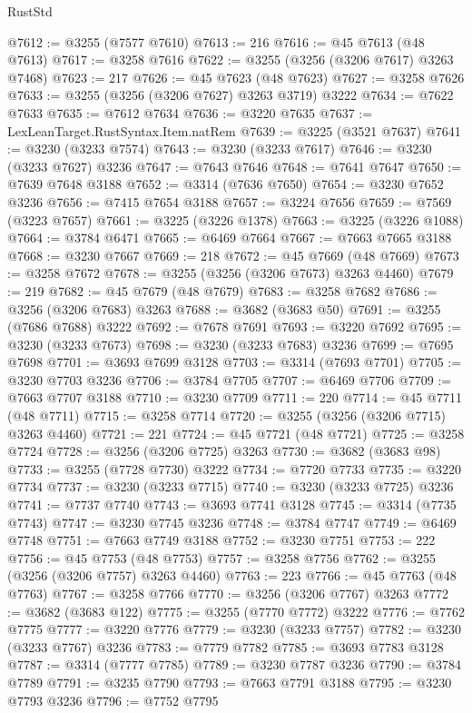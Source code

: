 \begin{lexlean}{RustStd}
\begin{coremodule}
{\begin{coremodule}
{{{{{{{{{{{{{{{{{{{{{{{{{{{{{{{{{{{{{@7612 := @3255 (@7577 @7610)
@7613 := 216
@7616 := @45 @7613 (@48 @7613)
@7617 := @3258 @7616
@7622 := @3255 (@3256 (@3206 @7617) @3263 @7468)
@7623 := 217
@7626 := @45 @7623 (@48 @7623)
@7627 := @3258 @7626
@7633 := @3255 (@3256 (@3206 @7627) @3263 @3719) @3222
@7634 := @7622 @7633
@7635 := @7612 @7634
@7636 := @3220 @7635
@7637 := LexLeanTarget.RustSyntax.Item.natRem
@7639 := @3225 (@3521 @7637)
@7641 := @3230 (@3233 @7574)
@7643 := @3230 (@3233 @7617)
@7646 := @3230 (@3233 @7627) @3236
@7647 := @7643 @7646
@7648 := @7641 @7647
@7650 := @7639 @7648 @3188
@7652 := @3314 (@7636 @7650)
@7654 := @3230 @7652 @3236
@7656 := @7415 @7654 @3188
@7657 := @3224 @7656
@7659 := @7569 (@3223 @7657)
@7661 := @3225 (@3226 @1378)
@7663 := @3225 (@3226 @1088)
@7664 := @3784 @6471
@7665 := @6469 @7664
@7667 := @7663 @7665 @3188
@7668 := @3230 @7667
@7669 := 218
@7672 := @45 @7669 (@48 @7669)
@7673 := @3258 @7672
@7678 := @3255 (@3256 (@3206 @7673) @3263 @4460)
@7679 := 219
@7682 := @45 @7679 (@48 @7679)
@7683 := @3258 @7682
@7686 := @3256 (@3206 @7683) @3263
@7688 := @3682 (@3683 @50)
@7691 := @3255 (@7686 @7688) @3222
@7692 := @7678 @7691
@7693 := @3220 @7692
@7695 := @3230 (@3233 @7673)
@7698 := @3230 (@3233 @7683) @3236
@7699 := @7695 @7698
@7701 := @3693 @7699 @3128
@7703 := @3314 (@7693 @7701)
@7705 := @3230 @7703 @3236
@7706 := @3784 @7705
@7707 := @6469 @7706
@7709 := @7663 @7707 @3188
@7710 := @3230 @7709
@7711 := 220
@7714 := @45 @7711 (@48 @7711)
@7715 := @3258 @7714
@7720 := @3255 (@3256 (@3206 @7715) @3263 @4460)
@7721 := 221
@7724 := @45 @7721 (@48 @7721)
@7725 := @3258 @7724
@7728 := @3256 (@3206 @7725) @3263
@7730 := @3682 (@3683 @98)
@7733 := @3255 (@7728 @7730) @3222
@7734 := @7720 @7733
@7735 := @3220 @7734
@7737 := @3230 (@3233 @7715)
@7740 := @3230 (@3233 @7725) @3236
@7741 := @7737 @7740
@7743 := @3693 @7741 @3128
@7745 := @3314 (@7735 @7743)
@7747 := @3230 @7745 @3236
@7748 := @3784 @7747
@7749 := @6469 @7748
@7751 := @7663 @7749 @3188
@7752 := @3230 @7751
@7753 := 222
@7756 := @45 @7753 (@48 @7753)
@7757 := @3258 @7756
@7762 := @3255 (@3256 (@3206 @7757) @3263 @4460)
@7763 := 223
@7766 := @45 @7763 (@48 @7763)
@7767 := @3258 @7766
@7770 := @3256 (@3206 @7767) @3263
@7772 := @3682 (@3683 @122)
@7775 := @3255 (@7770 @7772) @3222
@7776 := @7762 @7775
@7777 := @3220 @7776
@7779 := @3230 (@3233 @7757)
@7782 := @3230 (@3233 @7767) @3236
@7783 := @7779 @7782
@7785 := @3693 @7783 @3128
@7787 := @3314 (@7777 @7785)
@7789 := @3230 @7787 @3236
@7790 := @3784 @7789
@7791 := @3235 @7790
@7793 := @7663 @7791 @3188
@7795 := @3230 @7793 @3236
@7796 := @7752 @7795
}}}}}}}}}}}}}}}}}}}}}}}}}}}}}}}}}}}}}
\end{coremodule}}
\end{coremodule}
\end{lexlean}
